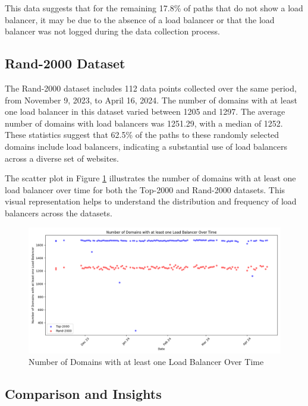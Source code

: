 \documentclass[12pt]{cwru_thesis}
\begin{document}
This data suggests that for the remaining 17.8\% of paths that do not show a load balancer, it may be due to the absence of a load balancer or that the load balancer was not logged during the data collection process.



\subsection{Rand-2000 Dataset}

The Rand-2000 dataset includes 112 data points collected over the same period, from November 9, 2023, to April 16, 2024. The number of domains with at least one load balancer in this dataset varied between 1205 and 1297. The average number of domains with load balancers was 1251.29, with a median of 1252. These statistics suggest that 62.5\% of the paths to these randomly selected domains include load balancers, indicating a substantial use of load balancers across a diverse set of websites.


The scatter plot in Figure \ref{fig:scatter_plot_domains} illustrates the number of domains with at least one load balancer over time for both the Top-2000 and Rand-2000 datasets. 
This visual representation helps to understand the distribution and frequency of load balancers across the datasets.

\begin{figure}[h]
    \centering
    \includegraphics[width=\textwidth]{figures/scatter_plot_domains.png}
    \caption{Number of Domains with at least one Load Balancer Over Time}
    \label{fig:scatter_plot_domains}
\end{figure}
\subsection{Comparison and Insights}
\end{document}
